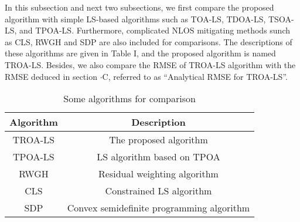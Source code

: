\documentclass[journal]{IEEEtran}
\begin{document}
In this subsection and next two subsections, we first compare the proposed algorithm with simple LS-based algorithms such as TOA-LS, TDOA-LS, TSOA-LS, and TPOA-LS. Furthermore, complicated NLOS mitigating methods sunch as CLS, RWGH and SDP are also included for comparisons. The descriptions of these algorithms are given in Table I, and the proposed algorithm is named TROA-LS. Besides, we also compare the RMSE of TROA-LS algorithm with the RMSE deduced in section \uppercase\expandafter{}${\cdot}$C, referred to as “Analytical RMSE for TROA-LS”.

\begin{table}[htbp]
   \centering
   \renewcommand{\arraystretch}{1.1}\vspace{-0.cm}
   \caption{Some algorithms for comparison}
   \begin{center}\vspace{-0cm}
   \begin{tabular}{cc}
   \hline
   Algorithm & Description  \\
   \hline
     TROA-LS & The proposed algorithm \\
     TPOA-LS & LS algorithm based on TPOA \cite{re33} \\
     RWGH & Residual weighting algorithm\cite{re34}\\
     CLS & Constrained LS algorithm\cite{re35}\\
     SDP & Convex semidefinite programming algorithm\cite{re32}\\
   \hline
   \end{tabular}
   \end{center}\vspace{-0cm}
   \end{table}
\end{document}
